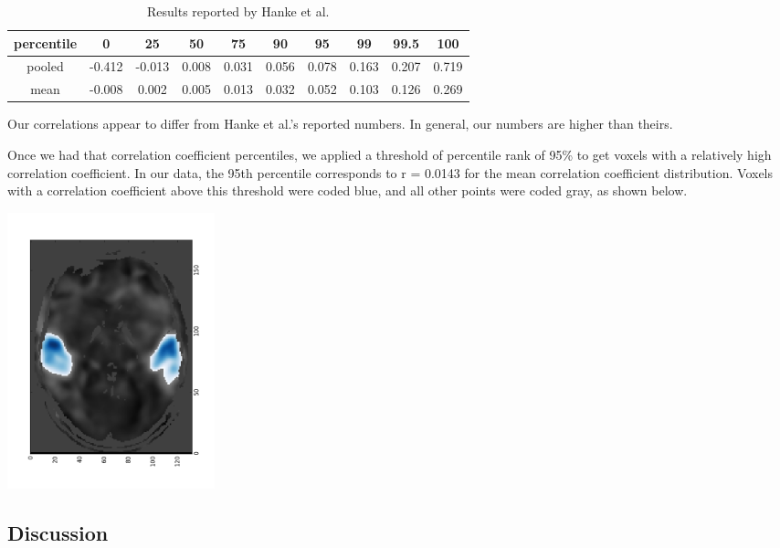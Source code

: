 \documentclass[11pt]{article}
\begin{document}
\begin{table}[ht]
  \centering
  \caption{Results reported by Hanke et al.}
  \label{tab:table2}
  \begin{tabular}{cccccccccc}
    percentile & 0 & 25 & 50 & 75 & 90 & 95 & 99 & 99.5 & 100\\
    \hline
    pooled & {-0.412} & {-0.013} & 0.008 & 0.031 & 0.056 & 0.078 & 0.163 & 0.207 & 0.719\\
    \hline
    mean & -{0.008} & 0.002 & 0.005 & 0.013 & 0.032 & 0.052 & 0.103 & 0.126 & 0.269\\
  \end{tabular}
\end{table}

Our correlations appear to differ from Hanke et al.'s reported numbers.  In 
general, our numbers are higher than theirs.

Once we had that correlation coefficient percentiles, we applied a threshold of 
percentile rank of 95\% to get voxels with a relatively high correlation 
coefficient.  In our data, the 95th percentile corresponds to r = 0.0143 for 
the mean correlation coefficient distribution.  Voxels with a correlation
coefficient above this threshold were coded blue, and all other points 
were coded gray, as shown below.  
\begin{center}
\includegraphics[height=8cm]{correlated_brain.png}
\end{center}

\subsection{Discussion}
\end{document}
